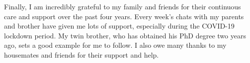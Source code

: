 Finally, I am incredibly grateful to my family and friends for their continuous care and support over the past four years. Every week's chats with my parents and brother have given me lots of support, especially during the COVID-19 lockdown period. My twin brother, who has obtained his PhD degree two years ago, sets a good example for me to follow. I also owe many thanks to my housemates and friends for their support and help.


% 
%

%

\newpage
\pagestyle{fancy}
\bgroup
\hypersetup{linkcolor=black}
\setcounter{tocdepth}{2}
\tableofcontents
\egroup

\newpage
{}
\bgroup
\hypersetup{linkcolor=black}
\listoftables
\egroup

